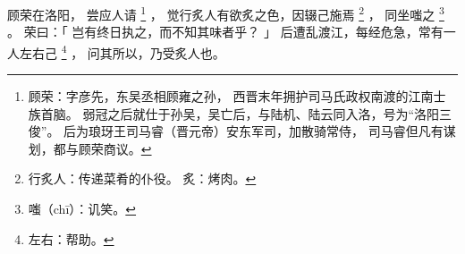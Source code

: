 
\switchcolumn*[\section{}]

顾荣在洛阳，
尝应人请%
\footnote{%
    顾荣：字彦先，东吴丞相顾雍之孙，
          西晋末年拥护司马氏政权南渡的江南士族首脑。
          弱冠之后就仕于孙吴，吴亡后，与陆机、陆云同入洛，号为“洛阳三俊”。
          后为琅玡王司马睿（晋元帝）安东军司，加散骑常侍，
          司马睿但凡有谋划，都与顾荣商议。
}%
，
觉行炙人有欲炙之色，因辍己施焉%
\footnote{%
    行炙人：传递菜肴的仆役。
    炙：烤肉。
}%
，
同坐嗤之%
\footnote{%
    嗤（chī）：讥笑。
}%
。
荣曰：「
    岂有终日执之，而不知其味者乎？
」
后遭乱渡江，每经危急，常有一人左右己%
\footnote{%
    左右：帮助。
}%
，
问其所以，乃受炙人也。

\switchcolumn



